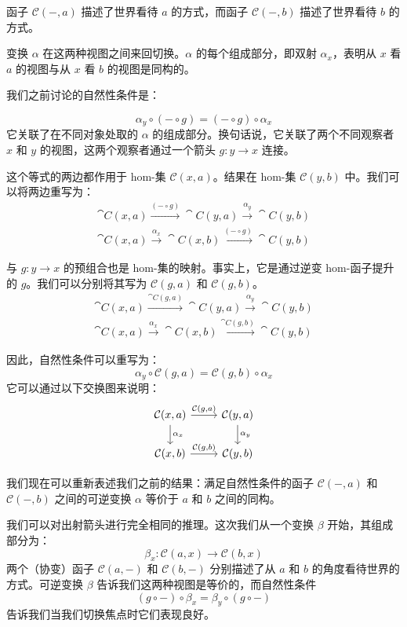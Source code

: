 \documentclass[DaoFP]{subfiles}
\begin{document}
函子 $\mathcal{C}(-, a)$ 描述了世界看待 $a$ 的方式，而函子 $\mathcal{C}(-, b)$ 描述了世界看待 $b$ 的方式。

变换 $\alpha$ 在这两种视图之间来回切换。$\alpha$ 的每个组成部分，即双射 $\alpha_x$，表明从 $x$ 看 $a$ 的视图与从 $x$ 看 $b$ 的视图是同构的。

我们之前讨论的自然性条件是：

\[ \alpha_y \circ (- \circ g) = (- \circ g) \circ \alpha_x \]
它关联了在不同对象处取的 $\alpha$ 的组成部分。换句话说，它关联了两个不同观察者 $x$ 和 $y$ 的视图，这两个观察者通过一个箭头 $g \colon y \to x$ 连接。

这个等式的两边都作用于 hom-集 $\mathcal{C}(x, a)$。结果在 hom-集 $\mathcal{C}(y, b)$ 中。我们可以将两边重写为：
\begin{align*}
 \cat C(x, a) \xrightarrow{(- \circ g)} \cat C(y, a) \xrightarrow{\alpha_y} \cat C(y, b) \\
\cat C(x, a) \xrightarrow{\alpha_x}  \cat C(x, b)  \xrightarrow{(- \circ g)}\cat C(y, b)
\end{align*}

与 $g \colon y \to x$ 的预组合也是 hom-集的映射。事实上，它是通过逆变 hom-函子提升的 $g$。我们可以分别将其写为 $\mathcal{C}(g, a)$ 和 $\mathcal{C}(g, b)$。
\begin{align*}
 \cat C(x, a) \xrightarrow{\cat C(g, a)} \cat C(y, a) \xrightarrow{\alpha_y} \cat C(y, b) \\
\cat C(x, a) \xrightarrow{\alpha_x}  \cat C(x, b)  \xrightarrow{\cat C(g, b)}\cat C(y, b)
\end{align*}

因此，自然性条件可以重写为：
\[ \alpha_y \circ \mathcal{C}(g, a) = \mathcal{C}(g, b) \circ \alpha_x \]
它可以通过以下交换图来说明：
\[
 \begin{tikzcd}
 \mathcal{C}(x, a)
 \arrow[d, "\alpha_x"]
 \arrow[r, "{\mathcal{C}(g, a)}"]
 &
 \mathcal{C}(y, a)
  \arrow[d, "\alpha_y"]
 \\
 \mathcal{C}(x, b)
 \arrow[r, "{\mathcal{C}(g, b)}"]
& \mathcal{C}(y, b)
 \end{tikzcd}
\]

我们现在可以重新表述我们之前的结果：满足自然性条件的函子 $\mathcal{C}(-, a)$ 和 $\mathcal{C}(-, b)$ 之间的可逆变换 $\alpha$ 等价于 $a$ 和 $b$ 之间的同构。

我们可以对出射箭头进行完全相同的推理。这次我们从一个变换 $\beta$ 开始，其组成部分为：
\[ \beta_x \colon \mathcal{C}(a, x) \to \mathcal{C}(b, x) \]
两个（协变）函子 $\mathcal{C}(a, -)$ 和 $\mathcal{C}(b, -)$ 分别描述了从 $a$ 和 $b$ 的角度看待世界的方式。可逆变换 $\beta$ 告诉我们这两种视图是等价的，而自然性条件
\[ (g \circ -) \circ \beta_x = \beta_y \circ (g \circ -) \]
告诉我们当我们切换焦点时它们表现良好。
\end{document}
